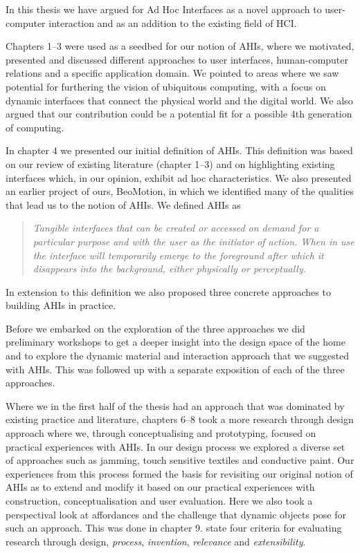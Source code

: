
In this thesis we have argued for Ad Hoc Interfaces as a novel approach to user-computer interaction and as an addition to the existing field of HCI.

Chapters 1--3 were used as a seedbed for our notion of AHIs, where we motivated, presented and discussed different approaches to user interfaces, human-computer relations and a specific application domain.
We pointed to areas where we saw potential for furthering the vision of ubiquitous computing, with a focus on dynamic interfaces that connect the physical world and the digital world.
We also argued that our contribution could be a potential fit for a possible 4th generation of computing.  

In chapter 4 we presented our initial definition of AHIs.
This definition was based on our review of existing literature (chapter 1--3) and on highlighting existing interfaces which, in our opinion, exhibit ad hoc characteristics.
We also presented an earlier project of ours, BeoMotion, in which we identified many of the qualities that lead us to the notion of AHIs.
We defined AHIs as 

\begin{quotation}
\emph{Tangible interfaces that can be created or accessed on demand for a particular purpose and with the user as the initiator of action. When in use the interface will temporarily emerge to the foreground after which it disappears into the background, either physically or perceptually.}
\end{quotation}
In extension to this definition we also proposed three concrete approaches to building AHIs in practice.

Before we embarked on the exploration of the three approaches we did preliminary workshops to get a deeper insight into the design space of the home and to explore the dynamic material and interaction approach that we suggested with AHIs.
This was followed up with a separate exposition of each of the three approaches.

Where we in the first half of the thesis had an approach that was dominated by existing practice and literature, chapters 6--8 took a more research through design approach where we, through conceptualising and prototyping, focused on practical experiences with AHIs.
In our design process we explored a diverse set of approaches such as jamming, touch sensitive textiles and conductive paint.
Our experiences from this process formed the basis for revisiting our original notion of AHIs as to extend and modify it based on our practical experiences with construction, conceptualisation and user evaluation.
Here we also took a perspectival look at affordances and the challenge that dynamic objects pose for such an approach.
This was done in chapter 9.
\blank
\citet{zimmerman2007research} state four criteria for evaluating research through design, \emph{process}, \emph{invention}, \emph{relevance} and \emph{extensibility}.

